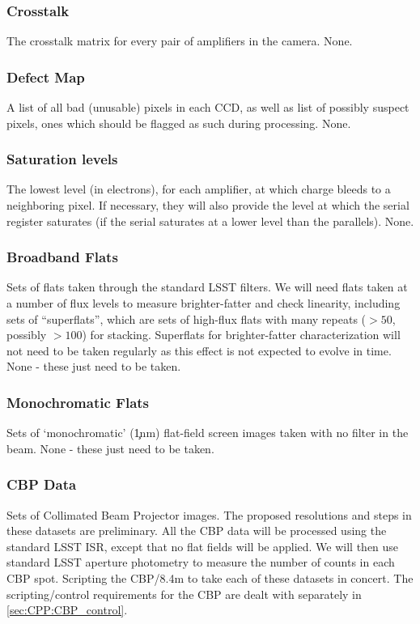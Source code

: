 \subsubsection{Crosstalk}\label{sec:CPP:inputs:crosstalk}
\cameraTeam
The crosstalk matrix for every pair of amplifiers in the camera.
\alg None.


\subsubsection{Defect Map}\label{sec:CPP:inputs:defectList} 
\cameraTeam
A list of all bad (unusable) pixels in each CCD, as well as list of possibly suspect pixels, \ie ones which should be flagged as such during processing.
\alg None.


\subsubsection{Saturation levels}\label{sec:CPP:inputs:saturationLevel}
\cameraTeam
The lowest level (in electrons), for each amplifier, at which charge bleeds to a neighboring pixel. If necessary, they will also provide the level at which the serial register saturates (\ie if the serial saturates at a lower level than the parallels).
\alg None.


\subsubsection{Broadband Flats}\label{sec:CPP:inputs:broadFlat}
Sets of flats taken through the standard LSST filters. We will need flats taken at a number of flux levels to measure brighter-fatter and check linearity, including sets of ``superflats'', which are sets of high-flux flats with many repeats ($>50$, possibly $>100$) for stacking. Superflats for brighter-fatter characterization will not need to be taken regularly as this effect is not expected to evolve in time.
\alg None - these just need to be taken.


\subsubsection{Monochromatic Flats}\label{sec:CPP:inputs:monoFlat}
Sets of `monochromatic' (\c 1nm) flat-field screen images taken with no filter in the beam.
\alg None - these just need to be taken.


\subsubsection{CBP Data}\label{sec:CPP:inputs:CBP}
Sets of Collimated Beam Projector images. The proposed resolutions and steps in these datasets are preliminary. All the CBP data will be processed using the standard LSST ISR, except that no flat fields will be applied. We will then use standard LSST aperture photometry to measure the number of counts in each CBP spot.
\alg Scripting the CBP/8.4m to take each of these datasets in concert. The scripting/control requirements for the CBP are dealt with separately in \secsymbol\ref{sec:CPP:CBP_control}.


